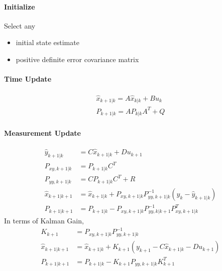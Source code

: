 	\paragraph{Initialize} Select any
	\begin{itemize}
		\item { initial state estimate}
		\item { positive definite error covariance matrix}
	\end{itemize}
	\paragraph{Time Update}
	\begin{equation}
		\begin{split}
			\hat{x}_{k+1|k} = A\hat{x}_{k|k} + Bu_k \\
			P_{k+1|k} = AP_{k|k}A^T + Q
		\end{split}
		\label{kfeq2}
	\end{equation}
	\paragraph{Measurement Update}
	\begin{equation}
		\begin{split}
			\hat{y}_{k+1|k} &= C\hat{x}_{k+1|k} + Du_{k+1} \\
			P_{xy,k+1|k} &= P_{k+1|k}C^T  \\
			P_{yy,k+1|k} &= CP_{k+1|k}C^T + R \\
			\hat{x}_{k+1|k+1} &= \hat{x}_{k+1|k} + P_{xy,k+1|k}P^{-1}_{yy,k+1|k}(y_k - \hat{y}_{k+1|k}) \\
			P_{k+1|k+1} &= P_{k+1|k} - P_{xy,k+1|k}P^{-1}_{yy,k|k+1}P^T_{xy,k+1|k}
		\end{split}
		\label{kfeq3}
	\end{equation}
	In terms of Kalman Gain,
	\begin{equation}
		\begin{split}
			K_{k+1} &= P_{xy,k+1|k}P^{-1}_{yy,k+1|k}\\
			\hat{x}_{k+1|k+1} &= \hat{x}_{k+1|k} + K_{k+1}(y_{k+1} - C\hat{x}_{k+1|k} - Du_{k+1}) \\
			P_{k+1|k+1} &= P_{k+1|k} - K_{k+1} P_{yy,k+1|k}K^T_{k+1}
		\end{split}
		\label{kfeq4}
	\end{equation}
